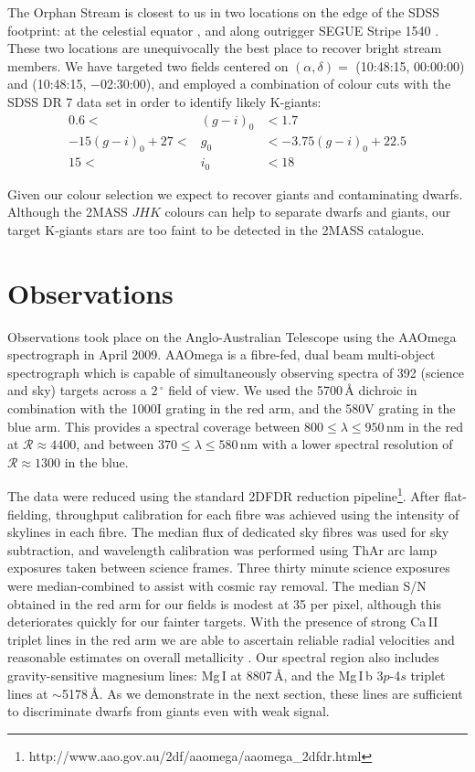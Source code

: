 \documentclass[10pt,apjl]{emulateapj}
\begin{document}
The Orphan Stream is closest to us in two locations on the edge of the SDSS footprint: at the celestial equator \citep{Belokurov_et-al_2007}, and along outrigger SEGUE Stripe 1540 \citep{Newberg_et-al_2010}. These two locations are unequivocally the best place to recover bright stream members. We have targeted two fields centered on $(\alpha, \delta) =$ (10:48:15, 00:00:00) and (10:48:15, $-$02:30:00), and employed a combination of colour cuts with the SDSS DR 7 \citep{Abazajian_et-al_2009} data set in order to identify likely K-giants:
\begin{eqnarray}
0.6 <& (g-i)_0 &< 1.7 \\
-15(g-i)_0 + 27 <& g_0 &< -3.75(g-i)_0 + 22.5 \\
15  <& i_0  &< 18 
\end{eqnarray}

Given our colour selection we expect to recover giants and contaminating dwarfs. Although the 2MASS $JHK$ colours can help to separate dwarfs and giants, our target K-giants stars are too faint to be detected in the 2MASS catalogue.

\section{Observations}
\label{sec:observations}

Observations took place on the Anglo-Australian Telescope using the AAOmega spectrograph in April 2009. AAOmega is a fibre-fed, dual beam multi-object spectrograph which is capable of simultaneously observing spectra of 392 (science and sky) targets across a $2\,^\circ$ field of view. We used the 5700\,{\AA} dichroic in combination with the 1000I grating in the red arm, and the 580V grating in the blue arm. This provides a spectral coverage between $800 \leq \lambda \leq 950$\,nm in the red at $\mathcal{R} \approx 4400$, and between $370 \leq \lambda \leq 580$\,nm with a lower spectral resolution of $\mathcal{R} \approx 1300$ in the blue.

The data were reduced using the standard \textsc{2DFDR} reduction pipeline\footnote{http://www.aao.gov.au/2df/aaomega/aaomega\_2dfdr.html}. After flat-fielding, throughput calibration for each fibre was achieved using the intensity of skylines in each fibre. The median flux of dedicated sky fibres was used for sky subtraction, and wavelength calibration was performed using ThAr arc lamp exposures taken between science frames. Three thirty minute science exposures were median-combined to assist with cosmic ray removal. The median S/N obtained in the red arm for our fields is modest at 35 per pixel, although this deteriorates quickly for our fainter targets. With the presence of strong Ca\,\textsc{II} triplet lines in the red arm we are able to ascertain reliable radial velocities and reasonable estimates on overall metallicity \citep[][and references therein]{Starkenburg_et-al_2010}. Our spectral region also includes gravity-sensitive magnesium lines: Mg\,\textsc{I} at 8807\,{\AA}, and the Mg\,\textsc{I}\,b 3$p$-4$s$ triplet lines at $\sim$5178\,{\AA}. As we demonstrate in the next section, these lines are sufficient to discriminate dwarfs from giants even with weak signal.
\end{document}

